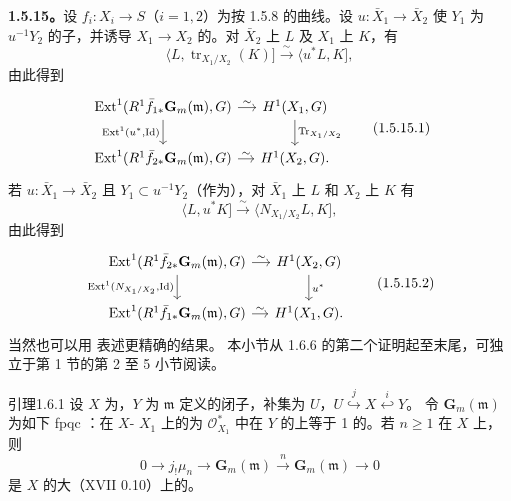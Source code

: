 \textbf{1.5.15。}设 $f_i:X_i\to S$（$i=1,2$）为按 1.5.8 的曲线。设 $u:\bar X_1\to\bar X_2$ 使 $Y_1$ 为 $u^{-1}Y_2$ 的子，并诱导 $X_1\to X_2$ 的。对 $\bar X_2$ 上 $L$ 及 $X_1$ 上 $K$，有
\[\langle L,\operatorname{tr}_{X_1/X_2}(K)]\xrightarrow\sim\langle u^*L,K],\]
由此得到
\[\begin{tikzcd}[column sep=small]\operatorname{Ext}^1(R^1\bar f_{1*}\mathbf G_m(\mathfrak m),G)\arrow[r,"\sim"]\arrow[d,"{\operatorname{Ext}^1(u^*,\operatorname{Id})}"']&H^1(X_1,G)\arrow[d,"\operatorname{Tr}_{X_1/X_2}"]\\\operatorname{Ext}^1(R^1\bar f_{2*}\mathbf G_m(\mathfrak m),G)\arrow[r,"\sim"]&H^1(X_2,G).\end{tikzcd}\tag{1.5.15.1}\]
若 $u:\bar X_1\to\bar X_2$ 且 $Y_1\subset u^{-1}Y_2$（作为），对 $\bar X_1$ 上 $L$ 和 $X_2$ 上 $K$ 有
\[\langle L,u^*K]\xrightarrow\sim\langle N_{X_1/X_2}L,K],\]
由此得到
\[\begin{tikzcd}[column sep=small]\operatorname{Ext}^1(R^1\bar f_{2*}\mathbf G_m(\mathfrak m),G)\arrow[r,"\sim"]\arrow[d,"{\operatorname{Ext}^1(N_{X_1/X_2},\operatorname{Id})}"']&H^1(X_2,G)\arrow[d,"u^*"]\\\operatorname{Ext}^1(R^1\bar f_{1*}\mathbf G_m(\mathfrak m),G)\arrow[r,"\sim"]&H^1(X_1,G).\end{tikzcd}\tag{1.5.15.2}\]
当然也可以用 表述更精确的结果。
本小节从 1.6.6 的第二个证明起至末尾，可独立于第 1 节的第 2 至 5 小节阅读。
\begin{SGAresult}{引理}{1.6.1}
设 $X$ 为，$Y$ 为 $\mathfrak m$ 定义的闭子，补集为 $U$，$U\overset j\hookrightarrow X\overset i\hookleftarrow Y$。
令 $\mathbf G_m(\mathfrak m)$ 为如下 fpqc ：在 $X$- $X_1$ 上的为 $\mathcal O_{X_1}^*$ 中在 $Y$ 的上等于 1 的。若 $n\ge1$ 在 $X$ 上，则
\[0\to j_!\mu_n\to\mathbf G_m(\mathfrak m)\xrightarrow n\mathbf G_m(\mathfrak m)\to0\]
是 $X$ 的大（XVII 0.10）上的。
\end{SGAresult}
